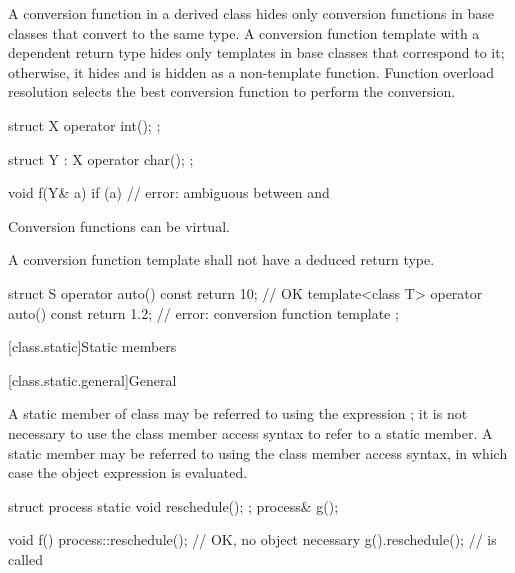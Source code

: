 \pnum
{}%
\begin{note}
A conversion function in a derived class hides only
conversion functions in base classes that convert to the same type.
A conversion function template with a dependent return type hides only
templates in base classes that correspond to it;
otherwise, it hides and is hidden as a non-template function.
Function overload resolution selects
the best conversion function to perform the conversion.
\begin{example}
\begin{codeblock}
struct X {
  operator int();
};

struct Y : X {
    operator char();
};

void f(Y& a) {
  if (a) {          // error: ambiguous between  and 
  }
}
\end{codeblock}
\end{example}
\end{note}

\pnum
{}%
Conversion functions can be virtual.

\pnum
{}%
A conversion function template shall not have a
deduced return type.
\begin{example}
\begin{codeblock}
struct S {
  operator auto() const { return 10; }      // OK
  template<class T>
  operator auto() const { return 1.2; }     // error: conversion function template
};
\end{codeblock}
\end{example}

[class.static]{Static members}%

[class.static.general]{General}%
%

\pnum
A static member  of class  may be referred to
using the  expression ; it is not
necessary to use the class member access syntax to
refer to a static member. A static member may be
referred to using the class member access syntax, in which case the
object expression is evaluated.
\begin{example}
\begin{codeblock}
struct process {
  static void reschedule();
};
process& g();

void f() {
  process::reschedule();        // OK, no object necessary
  g().reschedule();             //  is called
}
\end{codeblock}
\end{example}


